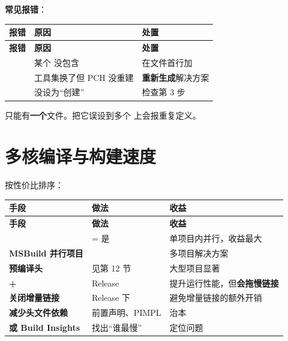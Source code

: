 {{\textbf{常见报错}：

\begin{longtable}{L{8.2cm}L{3.2cm}L{3.0cm}}
\toprule
\textbf{报错} & \textbf{原因} & \textbf{处置} \\
\midrule
\endfirsthead
\toprule
\textbf{报错} & \textbf{原因} & \textbf{处置} \\
\midrule
\endhead
\bottomrule
\endlastfoot
{} & 某个  没包含  & 在文件首行加  \\
 & 工具集换了但 PCH 没重建 & \textbf{重新生成}解决方案 \\
 &  没设为“创建” & 检查第 3 步 \\
\end{longtable}

\begin{warnbox}[注意]
 只能有\textbf{一个}文件。把它误设到多个  上会报重复定义。
\end{warnbox}

\section{多核编译与构建速度}

按性价比排序：

\begin{longtable}{L{4.2cm}L{6.6cm}L{3.6cm}}
\toprule
\textbf{手段} & \textbf{做法} & \textbf{收益} \\
\midrule
\endfirsthead
\toprule
\textbf{手段} & \textbf{做法} & \textbf{收益} \\
\midrule
\endhead
\bottomrule
\endlastfoot
\textbf{} &  = 是 & 单项目内并行，收益最大 \\
\textbf{MSBuild 并行项目} &  & 多项目解决方案 \\
\textbf{预编译头} & 见第 12 节 & 大型项目显著 \\
\textbf{ + } & Release & 提升运行性能，但\textbf{会拖慢链接} \\
\textbf{关闭增量链接} & Release 下 & 避免增量链接的额外开销 \\
\textbf{减少头文件依赖} & 前置声明、PIMPL & 治本 \\
\textbf{ 或 Build Insights} & 找出“谁最慢” & 定位问题 \\
\end{longtable}

}}
